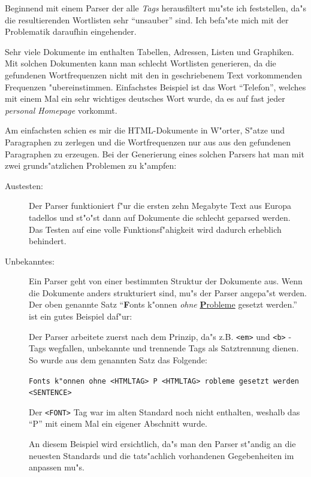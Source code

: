 Beginnend mit einem Parser der alle {\em Tags} herausfiltert mu"ste ich feststellen, da"s die resultierenden Wortlisten sehr "`unsauber"' sind. Ich befa"ste mich mit der Problematik daraufhin eingehender.

Sehr viele Dokumente im \www enthalten Tabellen, Adressen, Listen und Graphiken. Mit solchen Dokumenten kann man schlecht Wortlisten generieren, da die gefundenen Wortfrequenzen nicht mit den in geschriebenem Text vorkommenden Frequenzen "ubereinstimmen. Einfachstes Beispiel ist das Wort "`Telefon"', welches mit einem Mal ein sehr wichtiges deutsches Wort wurde, da es auf fast jeder {\em personal Homepage} vorkommt.

Am einfachsten schien es mir die HTML-Dokumente in W"orter, S"atze und Paragraphen zu zerlegen und die Wortfrequenzen nur aus aus den gefundenen Paragraphen zu erzeugen. Bei der Generierung eines solchen Parsers hat man mit zwei grunds"atzlichen Problemen zu k"ampfen:

\begin{description}
\item[Austesten:] Der Parser funktioniert f"ur die ersten zehn Megabyte Text aus Europa tadellos und st"o"st dann auf Dokumente die schlecht geparsed werden. Das Testen auf eine volle Funktionsf"ahigkeit wird dadurch erheblich behindert.

\item[Unbekanntes:] Ein Parser geht von einer bestimmten Struktur der Dokumente aus. Wenn die Dokumente anders strukturiert sind, mu"s der Parser angepa"st werden. Der oben genannte Satz "`{\bf F}onts k"onnen {\em ohne} \underline{{\bf P}robleme} gesetzt werden."' ist ein gutes Beispiel daf"ur:

Der Parser arbeitete zuerst nach dem Prinzip, da"s z.B. \verb|<em>| und \verb|<b>| -Tags wegfallen, unbekannte und trennende Tags als Satztrennung dienen. So wurde aus dem genannten Satz das Folgende:

{\tt Fonts k"onnen ohne <HTMLTAG> \nl
P <HTMLTAG> \nl
robleme gesetzt werden <SENTENCE> }

Der \verb|<FONT>| Tag war im alten Standard noch nicht enthalten, weshalb das "`P"' mit einem Mal ein eigener Abschnitt wurde.

An diesem Beispiel wird ersichtlich, da"s man den Parser st"andig an die neuesten Standards und die tats"achlich vorhandenen Gegebenheiten im \www anpassen mu"s.

\end{description}




